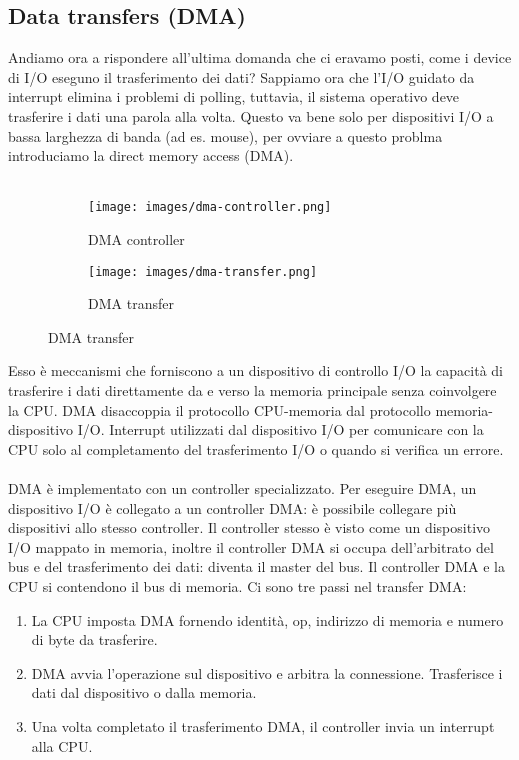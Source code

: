 \subsection{Data transfers (DMA)}
Andiamo ora a rispondere all'ultima domanda che ci eravamo posti, come i device di I/O eseguno il trasferimento dei dati?
Sappiamo ora che l'I/O guidato da interrupt elimina i problemi di polling, tuttavia, il sistema operativo deve trasferire i dati una parola alla volta. Questo va bene solo per dispositivi I/O a bassa larghezza di banda (ad es. mouse), per ovviare
a questo problma introduciamo la direct memory access (DMA).\\\\
\begin{figure}[h!]
    \centering
    \begin{subfigure}{.32\textwidth}
        \centering
        \texttt{[image: images/dma-controller.png]}
        \caption{DMA controller}
    \end{subfigure}
    \begin{subfigure}{.32\textwidth}
        \centering
        \texttt{[image: images/dma-transfer.png]}
        \caption{DMA transfer}
    \end{subfigure}
\end{figure}
Esso è meccanismi che forniscono a un dispositivo di controllo I/O la capacità di trasferire i dati direttamente da e verso la memoria principale senza coinvolgere la CPU. 
DMA disaccoppia il protocollo CPU-memoria dal protocollo memoria-dispositivo I/O. Interrupt utilizzati dal dispositivo I/O per comunicare con la CPU solo al completamento del trasferimento I/O o quando si verifica un errore.\\\\
DMA è implementato con un controller specializzato. Per eseguire DMA, un dispositivo I/O è collegato a un controller DMA: è possibile collegare più dispositivi allo stesso controller. Il controller stesso è visto come un dispositivo I/O mappato in memoria, 
inoltre il controller DMA si occupa dell'arbitrato del bus e del trasferimento dei dati: diventa il master del bus. Il controller DMA e la CPU si contendono il bus di memoria.
Ci sono tre passi nel transfer DMA:
\begin{enumerate}
    \item La CPU imposta DMA fornendo identità, op, indirizzo di memoria e numero di byte da trasferire.
    \item DMA avvia l'operazione sul dispositivo e arbitra la connessione. Trasferisce i dati dal dispositivo o dalla memoria.
    \item Una volta completato il trasferimento DMA, il controller invia un interrupt alla CPU.
\end{enumerate}

